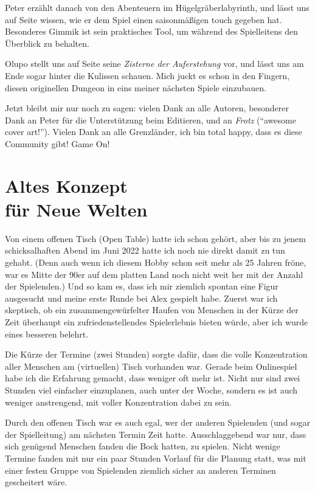 \documentclass[11pt]{wbzine}
\begin{document}
\begin{multicols}{2}
Peter erzählt danach von den Abenteuern im Hügelgräberlabyrinth, und
lässt uns auf Seite \pageref{halloween} wissen, wie er dem Spiel
einen saisonmäßigen touch gegeben hat. Besonderes Gimmik ist 
sein praktisches Tool, um während des Spielleitens den Überblick zu
behalten.

Olupo stellt uns auf Seite \pageref{zisterne} seine \textit{Zisterne
der Auferstehung} vor, und lässt uns am Ende sogar hinter die
Kulissen schauen. Mich juckt es schon in den Fingern, diesen
originellen Dungeon in eins meiner nächsten Spiele einzubauen.

Jetzt bleibt mir nur noch zu sagen: vielen Dank an alle Autoren,
besonderer Dank an Peter für die Unterstützung beim Editieren, und
an \textit{Frotz} (``awesome cover art!''). Vielen Dank an alle
Grenzländer, ich bin total happy, dass es diese Community gibt! Game
On!

\section{Altes Konzept\\ für Neue Welten}
\label{altes-konzept}
Von einem offenen Tisch (Open Table) hatte ich schon gehört, aber bis
zu jenem schicksalhaften Abend im Juni 2022 hatte ich noch nie direkt
damit zu tun gehabt. (Denn auch wenn ich diesem Hobby schon seit mehr
als 25 Jahren fröne, war es Mitte der 90er auf dem platten Land noch
nicht weit her mit der Anzahl der Spielenden.) Und so kam es, dass ich
mir ziemlich spontan eine Figur ausgesucht und meine erste Runde bei Alex
gespielt habe. Zuerst war ich skeptisch, ob ein zusammengewürfelter Haufen
von Menschen in der Kürze der Zeit überhaupt ein zufriedenstellendes
Spielerlebnis bieten würde, aber ich wurde eines besseren belehrt.

Die Kürze der Termine (zwei Stunden) sorgte dafür, dass die volle
Konzentration aller Menschen am (virtuellen) Tisch vorhanden war.
Gerade beim Onlinespiel habe ich die Erfahrung gemacht, dass weniger
oft mehr ist. Nicht nur sind zwei Stunden viel einfacher
einzuplanen, auch unter der Woche, sondern es ist auch weniger
anstrengend, mit voller Konzentration dabei zu sein.

Durch den offenen Tisch war es auch egal, wer der anderen Spielenden (und
sogar der Spielleitung) am nächsten Termin Zeit hatte. Ausschlaggebend
war nur, dass sich genügend Menschen fanden die Bock hatten, zu
spielen. Nicht wenige Termine fanden mit nur ein paar Stunden Vorlauf
für die Planung statt, was mit einer festen Gruppe von Spielenden
ziemlich sicher an anderen Terminen gescheitert wäre.


\end{multicols}
\end{document}
